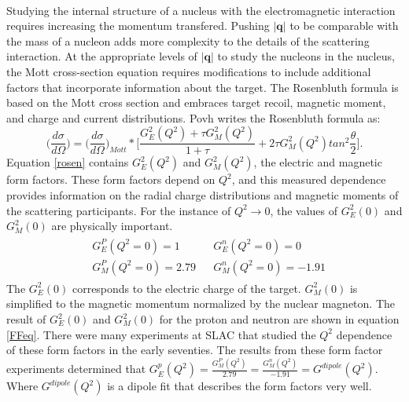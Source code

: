 \paragraph{} Studying the internal structure of a nucleus with the electromagnetic interaction requires increasing the momentum transfered. Pushing $|\boldsymbol{q}|$ to be comparable with the mass of a nucleon adds more complexity to the details of the scattering interaction. At the appropriate levels of $|\boldsymbol{q}|$ to study the nucleons in the nucleus, the Mott cross-section equation requires modifications to include additional factors that incorporate information about the target. The Rosenbluth formula is based on the Mott cross section and embraces target recoil, magnetic moment, and charge and current distributions. Povh writes the Rosenbluth formula as:
\begin{equation}
\label{rosen}
\bigg(\frac{d\sigma}{d\Omega}\bigg)=\bigg(\frac{d\sigma}{d\Omega}\bigg)_{Mott} *\bigg\lbrack \frac{G^2_E(Q^2) +\tau G^2_M(Q^2)}{1+\tau} + 2\tau G^2_M(Q^2)tan^2\frac{\theta}{2} \bigg\rbrack.
\end{equation}
Equation \ref{rosen} contains $G^2_E(Q^2)$ and $G^2_M(Q^2)$, the electric and magnetic form factors. These form factors depend on $Q^2$, and this measured dependence provides information on the radial charge distributions and magnetic moments of the scattering participants. For the instance of $Q^2 \rightarrow 0$, the values of  $G^2_E(0)$ and $G^2_M(0)$ are physically important.
\begin{align}
	\begin{split}
		&G^P_E(Q^2=0) = 1 \\
		&G^P_M(Q^2=0) = 2.79
	\end{split}
	\begin{split}
	    &G^n_E(Q^2=0) = 0 \\
	    &G^n_M(Q^2=0) = -1.91 \label{FFeq}
	\end{split}
\end{align}
The $G^2_E(0)$ corresponds to the electric charge of the target. $G^2_M(0)$ is simplified to the magnetic momentum normalized by the nuclear magneton. The result of $G^2_E(0)$ and $G^2_M(0)$ for the proton and neutron are shown in equation \ref{FFeq}\cite{PnN}. There were many experiments at SLAC that studied the $Q^2$ dependence of these form factors in the early seventies. The results from these form factor experiments determined that $G^p_E(Q^2) = \frac{G^P_M(Q^2)}{2.79} = \frac{G^n_M(Q^2)}{-1.91} = G^{dipole}(Q^2)$. Where $G^{dipole}(Q^2)$ is a dipole fit that describes the form factors very well\cite{PnN}. 
